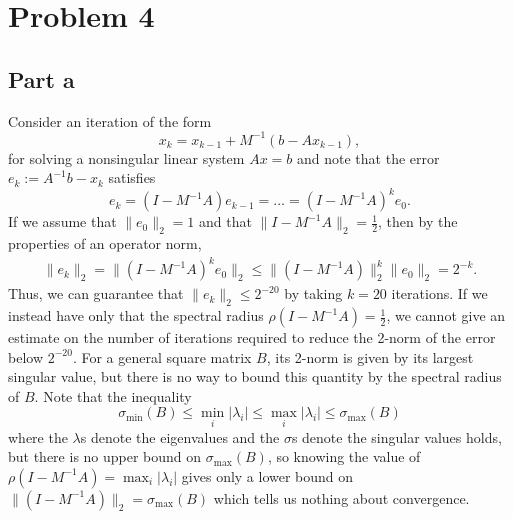 \documentclass{article}
\begin{document}
\section{Problem 4}
\subsection{Part a}
Consider an iteration of the form 
\[
x_k = x_{k-1} + M^{-1} ( b - A x_{k-1} ) ,
\]
for solving a nonsingular linear system $Ax=b$ and note that the error $e_k := A^{-1} b - x_k$
satisfies
\[
e_k = (I - M^{-1} A) e_{k-1} = \ldots = (I - M^{-1} A)^k e_0.
\]
If we assume that $\| e_0 \|_2 = 1$ and that $\| I - M^{-1} A \|_2 = \frac{1}{2}$, then by the properties of an operator norm,
\begin{align*}
\|e_k\|_2=\|(I - M^{-1} A)^k e_0\|_2\leq\|(I - M^{-1} A)\|^k_2\|e_0\|_2=2^{-k}. 
\end{align*}
Thus, we can guarantee that $\|e_k\|_2\leq 2^{-20}$ by taking $k=20$ iterations. If we instead have only that the spectral radius $\rho ( I - M^{-1} A ) = \frac{1}{2}$, we cannot give an estimate on the number of iterations
required to reduce the 2-norm of the error below $2^{-20}$. For a general square matrix $B$, its 2-norm is given by its largest singular value, but there is no way to bound this quantity by the spectral radius of $B$. Note that the inequality
\[
\sigma_{\text{min}}(B) \leq \min_{i}|\lambda_i|\leq\max_{i}|\lambda_i| \leq \sigma_{\text{max}}(B) 
\]
where the $\lambda$s denote the eigenvalues and the $\sigma$s denote the singular values holds, but there is no upper bound on $\sigma_{\text{max}}(B)$, so knowing the value of $\rho ( I - M^{-1} A )=\max_{i}|\lambda_i|$ gives only a lower bound on  $\|(I - M^{-1} A)\|_2=\sigma_{\text{max}}(B)$ which tells us nothing about convergence.
\end{document}
